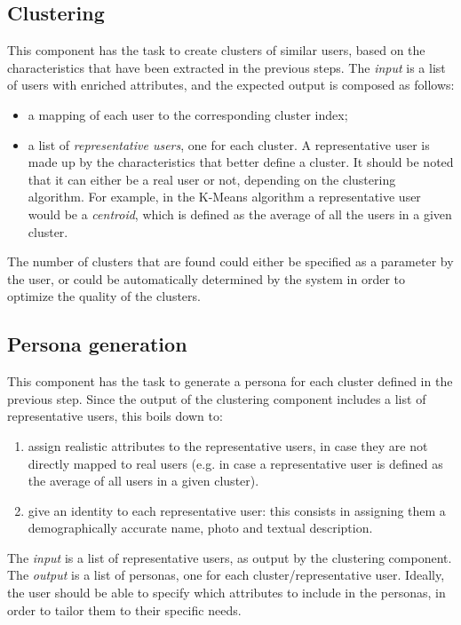\subsection{Clustering}
This component has the task to create clusters of similar users, based on the characteristics that have been extracted in the previous steps. The \emph{input} is a list of users with enriched attributes, and the expected output is composed as follows:
\begin{itemize}
    \item a mapping of each user to the corresponding cluster index;
    \item a list of \textit{representative users}, one for each cluster. A representative user is made up by the characteristics that better define a cluster. It should be noted that it can either be a real user or not, depending on the clustering algorithm. For example, in the K-Means algorithm a representative user would be a \emph{centroid}, which is defined as the average of all the users in a given cluster.
\end{itemize}
The number of clusters that are found could either be specified as a parameter by the user, or could be automatically determined by the system in order to optimize the quality of the clusters.

\subsection{Persona generation}
This component has the task to generate a persona for each cluster defined in the previous step. Since the output of the clustering component includes a list of representative users, this boils down to:
\begin{enumerate}
    \item assign realistic attributes to the representative users, in case they are not directly mapped to real users (e.g. in case a representative user is defined as the average of all users in a given cluster).
    \item give an identity to each representative user: this consists in assigning them a demographically accurate name, photo and textual description.
\end{enumerate}
The \emph{input} is a list of representative users, as output by the clustering component. The \emph{output} is a list of personas, one for each cluster/representative user. Ideally, the user should be able to specify which attributes to include in the personas, in order to tailor them to their specific needs. 


